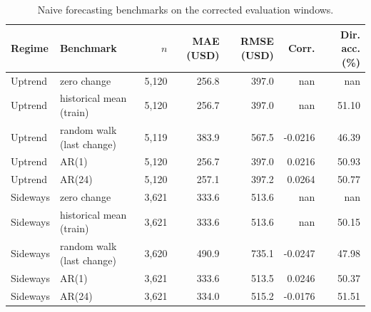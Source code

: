 \begin{table}[htbp]
\centering
\caption{Naive forecasting benchmarks on the corrected evaluation windows.}
\label{tab:itransformer_baselines}
\begin{tabular}{llrrrrr}
\hline
Regime & Benchmark & $n$ & MAE (USD) & RMSE (USD) & Corr. & Dir. acc. (\%) \\
\hline
        Uptrend & zero change & 5,120 & 256.8 & 397.0 & nan & nan \\
        Uptrend & historical mean (train) & 5,120 & 256.7 & 397.0 & nan & 51.10 \\
        Uptrend & random walk (last change) & 5,119 & 383.9 & 567.5 & -0.0216 & 46.39 \\
        Uptrend & AR(1) & 5,120 & 256.7 & 397.0 & 0.0216 & 50.93 \\
        Uptrend & AR(24) & 5,120 & 257.1 & 397.2 & 0.0264 & 50.77 \\
        Sideways & zero change & 3,621 & 333.6 & 513.6 & nan & nan \\
        Sideways & historical mean (train) & 3,621 & 333.6 & 513.6 & nan & 50.15 \\
        Sideways & random walk (last change) & 3,620 & 490.9 & 735.1 & -0.0247 & 47.98 \\
        Sideways & AR(1) & 3,621 & 333.6 & 513.5 & 0.0246 & 50.37 \\
        Sideways & AR(24) & 3,621 & 334.0 & 515.2 & -0.0176 & 51.51 \\
\hline
\end{tabular}
\end{table}
